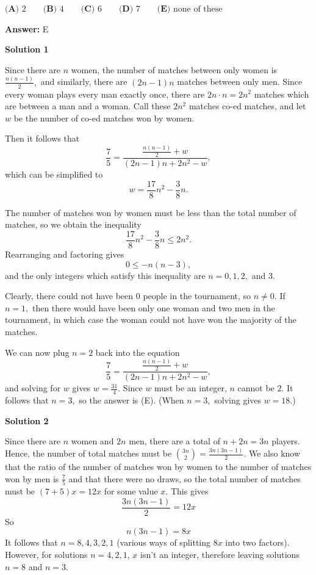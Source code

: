 \begin{enumerate}
 $\textbf{(A) }2\qquad \textbf{(B) }4\qquad \textbf{(C) }6\qquad \textbf{(D) }7\qquad  \textbf{(E) }\text{none of these}$

 \textbf{Answer: }E



\textbf{Solution 1}

Since there are $n$ women, the number of matches between only women is $\frac{n(n-1)}{2},$ and similarly, there are $(2n - 1)n$ matches between only men. Since every woman plays every man exactly once, there are $2n\cdot n = 2n^2$ matches which are between a man and a woman. Call these $2n^2$ matches co-ed matches, and let $w$ be the number of co-ed matches won by women.

 Then it follows that
 \[\frac 75 = \frac{\frac{n(n-1)}{2} + w}{(2n - 1)n + 2n^2 - w},\]which can be simplified to
 \[w = \frac{17}{8}n^2 - \frac38 n.\]

 The number of matches won by women must be less than the total number of matches, so we obtain the inequality
 \[\frac{17}{8}n^2 - \frac38 n\leq 2n^2.\]Rearranging and factoring gives
 \[0\leq -n(n-3),\]and the only integers which satisfy this inequality are $n = 0,1,2,$ and $3.$

 Clearly, there could not have been $0$ people in the tournament, so $n\neq 0.$ If $n = 1,$ then there would have been only one woman and two men in the tournament, in which case the woman could not have won the majority of the matches.

 We can now plug $n = 2$ back into the equation
 \[\frac 75 = \frac{\frac{n(n-1)}{2} + w}{(2n - 1)n + 2n^2 - w},\]and solving for $w$ gives $w = \frac{31}{4}.$ Since $w$ must be an integer, $n$ cannot be $2.$ It follows that $n = 3,$ so the answer is (E). (When $n = 3,$ solving gives $w = 18.$)

 



\textbf{Solution 2}

Since there are $n$ women and $2n$ men, there are a total of $n+2n=3n$ players. Hence, the number of total matches must be $\binom{3n}{2}=\frac{3n(3n-1)}{2}$. We also know that the ratio of the number of matches won by women to the number of matches won by men is $\frac{7}{5}$ and that there were no draws, so the total number of matches must be $(7+5)x=12x$ for some value $x$. This gives
 \[\frac{3n(3n-1)}{2}=12x\]So
 \[n(3n-1)=8x\]It follows that $n=8,4,3,2,1$ (various ways of splitting $8x$ into two factors). However, for solutions $n=4,2,1$, $x$ isn't an integer, therefore leaving solutions $n=8$ and $n=3$. 


\end{enumerate}
